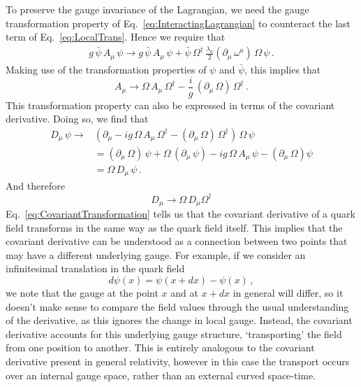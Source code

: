 %
To preserve the gauge invariance of the Lagrangian, we need the gauge transformation property of Eq.~\ref{eq:InteractingLagrangian} to counteract the last term of Eq.~\ref{eq:LocalTrans}. Hence we require that
%
\begin{align}
g\,\bar{\psi}\,A_\mu\,\psi \rightarrow g\,\bar{\psi}\,A_\mu\,\psi + \bar{\psi}\,\Omega^\dag\,\frac{\lambda_a}{2}(\partial_\mu\,\omega^a)\,\Omega\,\psi\, .
\end{align}
%
Making use of the transformation properties of $\psi$ and $\bar{\psi}$, this implies that
%
\begin{equation}
A_\mu\rightarrow \Omega\,A_\mu\,\Omega^\dag - \frac{i}{g}\,(\partial_\mu\,\Omega)\,\Omega^\dag\, . 
\label{eq:GaugePotentialTrans}
\end{equation}
%
This transformation property can also be expressed in terms of the covariant derivative. Doing so, we find that
%
\begin{align}
D_\mu\,\psi \rightarrow &\left(\partial_\mu -ig\,\Omega\,A_\mu\,\Omega^\dag - (\partial_\mu\,\Omega)\,\Omega^\dag\right)\,\Omega\,\psi\nonumber\\
&= (\partial_\mu\,\Omega)\,\psi + \Omega\,(\partial_\mu\,\psi) - ig\,\Omega\,A_\mu\,\psi - (\partial_\mu\,\Omega)\psi\nonumber\\
&=\Omega\,D_\mu\,\psi\, .\label{eq:CovariantTransformation}
\end{align}
%
And therefore
%
\begin{equation}
D_{\mu}\rightarrow\Omega\,D_\mu \Omega^\dag
\end{equation}
%
Eq.~\ref{eq:CovariantTransformation} tells us that the covariant derivative of a quark field transforms in the same way as the quark field itself. This implies that the covariant derivative can be understood as a connection between two points that may have a different underlying gauge. For example, if we consider an infinitesimal translation in the quark field
%
\begin{equation*}
d\psi(x) = \psi(x+dx)-\psi(x)\, ,
\end{equation*} 
%
we note that the gauge at the point $x$ and at $x+dx$ in general will differ, so it doesn't make sense to compare the field values through the usual understanding of the derivative, as this ignores the change in local gauge. Instead, the covariant derivative accounts for this underlying gauge structure, `transporting' the field from one position to another. This is entirely analogous to the covariant derivative present in general relativity, however in this case the transport occurs over an internal gauge space, rather than an external curved space-time.\\

